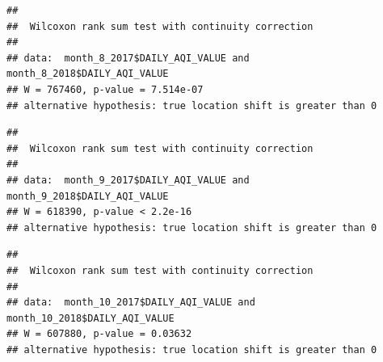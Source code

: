\documentclass[12pt,]{article}
\newenvironment{Shaded}{\begin{snugshade}}{\end{snugshade}}
\newcommand{\KeywordTok}[1]{\textcolor[rgb]{0.13,0.29,0.53}{\textbf{#1}}}
\newcommand{\DataTypeTok}[1]{\textcolor[rgb]{0.13,0.29,0.53}{#1}}
\newcommand{\DecValTok}[1]{\textcolor[rgb]{0.00,0.00,0.81}{#1}}
\newcommand{\StringTok}[1]{\textcolor[rgb]{0.31,0.60,0.02}{#1}}
\newcommand{\OperatorTok}[1]{\textcolor[rgb]{0.81,0.36,0.00}{\textbf{#1}}}
\newcommand{\NormalTok}[1]{#1}
\begin{document}
\begin{Shaded}
\end{Shaded}

\begin{verbatim}
## 
##  Wilcoxon rank sum test with continuity correction
## 
## data:  month_8_2017$DAILY_AQI_VALUE and month_8_2018$DAILY_AQI_VALUE
## W = 767460, p-value = 7.514e-07
## alternative hypothesis: true location shift is greater than 0
\end{verbatim}

\begin{Shaded}
\end{Shaded}

\begin{verbatim}
## 
##  Wilcoxon rank sum test with continuity correction
## 
## data:  month_9_2017$DAILY_AQI_VALUE and month_9_2018$DAILY_AQI_VALUE
## W = 618390, p-value < 2.2e-16
## alternative hypothesis: true location shift is greater than 0
\end{verbatim}

\begin{Shaded}
\end{Shaded}

\begin{verbatim}
## 
##  Wilcoxon rank sum test with continuity correction
## 
## data:  month_10_2017$DAILY_AQI_VALUE and month_10_2018$DAILY_AQI_VALUE
## W = 607880, p-value = 0.03632
## alternative hypothesis: true location shift is greater than 0
\end{verbatim}
\end{document}
